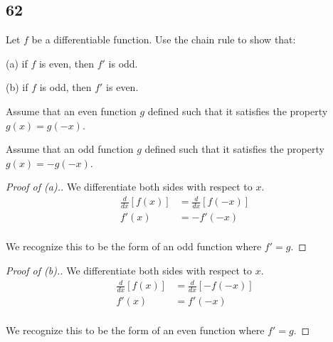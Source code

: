 \documentclass[../hw3.tex]{subfiles}
\begin{document}
\subsection*{62}
Let $f$ be a differentiable function. Use the chain rule to show that:

(a) if $f$ is even, then $f'$ is odd.

(b) if $f$ is odd, then $f'$ is even.

Assume that an even function $g$ defined such that it satisfies the property $g(x) = g(-x)$.

Assume that an odd function $g$ defined such that it satisfies the property $g(x) = -g(-x)$.

\begin{proof}[Proof of (a).]
    We differentiate both sides with respect to $x$.
    \begin{align*}
        \frac{d}{dx} \left[ f(x) \right] &= \frac{d}{dx} \left[ f(-x) \right] \\
        f'(x) &= -f'(-x) \\
    \end{align*}

    We recognize this to be the form of an odd function where $f' = g$.
\end{proof}

\begin{proof}[Proof of (b).]
    We differentiate both sides with respect to $x$.
    \begin{align*}
        \frac{d}{dx} \left[ f(x) \right] &= \frac{d}{dx} \left[ -f(-x) \right] \\
        f'(x) &= f'(-x) \\
    \end{align*}

    We recognize this to be the form of an even function where $f' = g$.
\end{proof}
\end{document}
